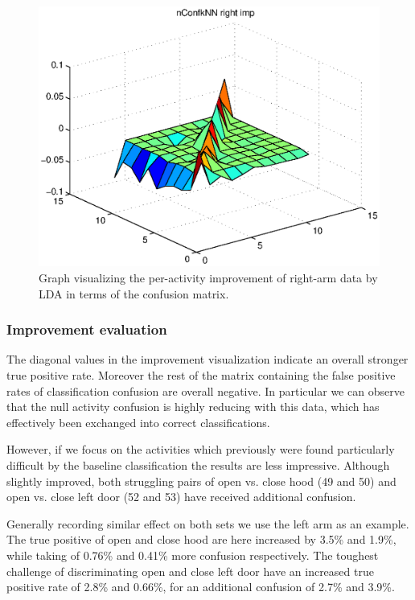 \documentclass{sig-alternate}
\begin{document}
\begin{figure}
  \centering
  \includegraphics[scale=0.4]{./matlab_output/nConfkNN_right_imp_LDA_3.eps}
  \caption{Graph visualizing the per-activity improvement of right-arm data by LDA in terms of the confusion matrix.}
  \label{fig:conf_right_imp_surf}
\end{figure}

\subsubsection{Improvement evaluation}
The diagonal values in the improvement visualization indicate an overall stronger true positive rate. Moreover the rest of the matrix containing the false positive rates of classification confusion are overall negative.  In particular we can observe that the null activity confusion is highly reducing with this data, which has effectively been exchanged into correct classifications.

However, if we focus on the activities which previously were found particularly difficult by the baseline classification the results are less impressive. Although slightly improved, both struggling pairs of open vs. close hood (49 and 50) and open vs. close left door (52 and 53) have received additional confusion.

Generally recording similar effect on both sets we use the left arm as an example. The true positive of open and close hood are here increased by 3.5\% and 1.9\%, while taking of 0.76\% and 0.41\% more confusion respectively. The toughest challenge of discriminating open and close left door have an increased true positive rate of 2.8\% and 0.66\%, for an additional confusion of 2.7\% and 3.9\%.
\end{document}
